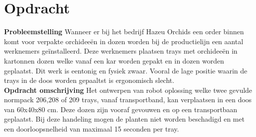 \section{Opdracht}
\begin{flushleft}
	\textbf{Probleemstelling}
	Wanneer er bij het bedrijf Hazeu Orchids een order binnen komt voor verpakte orchideeën in dozen worden bij de productielijn een aantal werknemers geïnstalleerd. Deze werknemers plaatsen trays met orchideeën in kartonnen dozen welke vanaf een kar worden gepakt en in dozen worden geplaatst. Dit werk is eentonig en fysiek zwaar. Vooral de lage positie waarin de trays in de doos worden gepaaltst is ergonomisch slecht.\\[0.5cm]
	
	
	\textbf{Opdracht omschrijving}
	Het ontwerpen van robot oplossing welke twee gevulde normpack  206,208 of 209 trays, vanaf transportband, kan verplaatsen in een doos van 60x40x80 cm. Deze dozen zijn vooraf gevouwen en op een transportbaan geplaatst. Bij deze handeling mogen de planten niet worden beschadigd en met een doorloopsnelheid van maximaal 15 seconden per tray.
	
	
\end{flushleft}

\newpage
